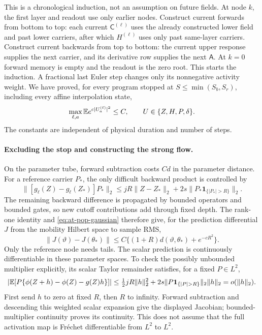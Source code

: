 This is a chronological induction, not an assumption on future fields.
At node $k$, the first layer and readout use only earlier nodes.
Construct current forwards from bottom to top: each current
$\mathsf C^{(\ell)}$ uses the already constructed lower field and past
lower carriers, after which $H^{(\ell)}$ uses only past same-layer
carriers.  Construct current backwards from top to bottom: the current
upper response supplies the next carrier, and its derivative row supplies
the next $\mathsf A$.  At $k=0$ forward memory is empty and the readout
is the zero root.  This starts the induction.  A fractional last Euler
step changes only its nonnegative activity weight.  We have proved, for
every program stopped at $S\le\min(S_b,S_r)$, including every affine
interpolation state,
\begin{equation}
 \max_{\ell,a}\mathbb{E} e^{c|U_a^{(\ell)}|^2}\le C,
 \qquad U\in\{Z,H,P,\delta\}.
 \label{eq:at-pop-gaussian}
\end{equation}
The constants are independent of physical duration and number of steps.

\paragraph{Excluding the stop and constructing the strong flow.}
On the parameter tube, forward subtraction costs $Cd$ in the parameter
distance.  For a reference carrier $P_*$, the only difficult backward
product is controlled by
\begin{equation}
 \|[g_\ell(Z)-g_\ell(Z_*)]P_*\|_2
 \le jR\|Z-Z_*\|_2+2s\|P_*\mathbf1_{\{|P_*|>R\}}\|_2 .
 \label{eq:at-reference-cutoff}
\end{equation}
The remaining backward difference is propagated by bounded operators
and bounded gates, so new cutoff contributions add through fixed depth.
The rank-one identity and \eqref{eq:at-pop-gaussian} therefore give,
for the prediction differential $J$ from the mobility Hilbert space to
sample RMS,
\begin{equation}
 \|J(\vartheta)-J(\theta_*)\|
 \le C\{(1+R)d(\vartheta,\theta_*)+e^{-cR^2}\}.
 \label{eq:at-jacobian-modulus}
\end{equation}
Only the reference node needs tails.  The scalar prediction is
continuously differentiable in these parameter spaces.  To check the
possibly unbounded multiplier explicitly, its scalar Taylor remainder
satisfies, for a fixed $P\in L^2$,
\[
 |\E[P\{\phi(Z+h)-\phi(Z)-g(Z)h\}]|
 \le \tfrac12jR\|h\|_2^2+
       2s\|P\mathbf1_{\{|P|>R\}}\|_2\|h\|_2=o(\|h\|_2).
\]
First send $h$ to zero at fixed $R$, then $R$ to infinity.
Forward subtraction and descending this weighted scalar expansion give
the displayed Jacobian; bounded-multiplier continuity proves its
continuity.  This does not assume that the full activation map is
Fréchet differentiable from $L^2$ to $L^2$.

